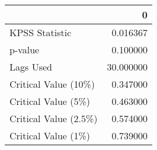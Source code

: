 \begin{tabular}{lr}
\toprule
{} &          0 \\
\midrule
KPSS Statistic        &   0.016367 \\
p-value               &   0.100000 \\
Lags Used             &  30.000000 \\
Critical Value (10\%)  &   0.347000 \\
Critical Value (5\%)   &   0.463000 \\
Critical Value (2.5\%) &   0.574000 \\
Critical Value (1\%)   &   0.739000 \\
\bottomrule
\end{tabular}
